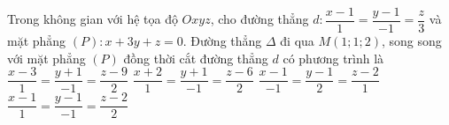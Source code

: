 \begin{ex}%
	Trong không gian với hệ tọa độ $Oxyz$, cho đường thẳng $d\colon \dfrac{x-1}{1}=\dfrac{y-1}{-1}=\dfrac{z}{3}$ và mặt phẳng $(P)\colon x+3y+z=0$. Đường thẳng $\Delta$ đi qua $M(1;1;2)$, song song với mặt phẳng $(P)$ đồng thời cắt đường thẳng $d$ có phương trình là
	\choice
	{$\dfrac{x-3}{1}=\dfrac{y+1}{-1}=\dfrac{z-9}{2}$}
	{$\dfrac{x+2}{1}=\dfrac{y+1}{-1}=\dfrac{z-6}{2}$}
	{$\dfrac{x-1}{-1}=\dfrac{y-1}{2}=\dfrac{z-2}{1}$}
	{\True $\dfrac{x-1}{1}=\dfrac{y-1}{-1}=\dfrac{z-2}{2}$}
\end{ex}
